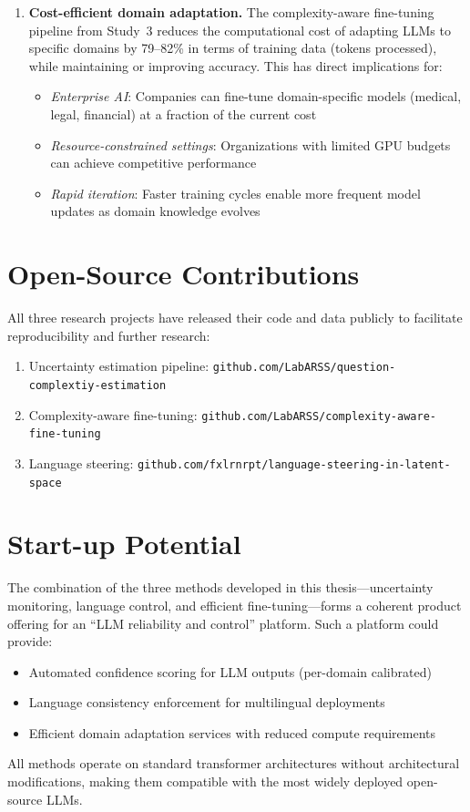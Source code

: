 \begin{enumerate}
    \item \textbf{Cost-efficient domain adaptation.} The complexity-aware fine-tuning pipeline from Study~3 reduces the computational cost of adapting LLMs to specific domains by 79--82\% in terms of training data (tokens processed), while maintaining or improving accuracy. This has direct implications for:
    \begin{itemize}
        \item \textit{Enterprise AI}: Companies can fine-tune domain-specific models (medical, legal, financial) at a fraction of the current cost
        \item \textit{Resource-constrained settings}: Organizations with limited GPU budgets can achieve competitive performance
        \item \textit{Rapid iteration}: Faster training cycles enable more frequent model updates as domain knowledge evolves
    \end{itemize}
\end{enumerate}

\section*{Open-Source Contributions}

All three research projects have released their code and data publicly to facilitate reproducibility and further research:
\begin{enumerate}
    \item Uncertainty estimation pipeline: \texttt{github.com/LabARSS/question-complextiy-estimation}
    \item Complexity-aware fine-tuning: \texttt{github.com/LabARSS/complexity-aware-fine-tuning}
    \item Language steering: \texttt{github.com/fxlrnrpt/language-steering-in-latent-space}
\end{enumerate}

\section*{Start-up Potential}

The combination of the three methods developed in this thesis---uncertainty monitoring, language control, and efficient fine-tuning---forms a coherent product offering for an ``LLM reliability and control'' platform. Such a platform could provide:
\begin{itemize}
    \item Automated confidence scoring for LLM outputs (per-domain calibrated)
    \item Language consistency enforcement for multilingual deployments
    \item Efficient domain adaptation services with reduced compute requirements
\end{itemize}
All methods operate on standard transformer architectures without architectural modifications, making them compatible with the most widely deployed open-source LLMs.
